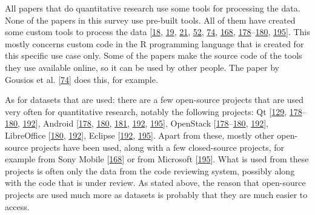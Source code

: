 \documentclass[]{book}
\begin{document}
All papers that do quantitative research use some tools for processing
the data. None of the papers in this survey use pre-built tools. All of
them have created some custom tools to process the data
{[}\protect\hyperlink{ref-baysal2016investigating}{18},
\protect\hyperlink{ref-baysal2013influence}{19},
\protect\hyperlink{ref-beller2014modern}{21},
\protect\hyperlink{ref-czerwonka2015code}{52},
\protect\hyperlink{ref-gousios2014exploratory}{74},
\protect\hyperlink{ref-shimagaki2016study}{168},
\protect\hyperlink{ref-thongtanunam2017review}{178}--\protect\hyperlink{ref-thongtanunam2015should}{180},
\protect\hyperlink{ref-zanjani2016automatically}{195}{]}. This mostly
concerns custom code in the R programming language that is created for
this specific use case only. Some of the papers make the source code of
the tools they use available online, so it can be used by other people.
The paper by Gousios et al.
{[}\protect\hyperlink{ref-gousios2014exploratory}{74}{]} does this, for
example.

As for datasets that are used: there are a few open-source projects that
are used very often for quantitative research, notably the following
projects: Qt {[}\protect\hyperlink{ref-mcintosh2014impact}{129},
\protect\hyperlink{ref-thongtanunam2017review}{178}--\protect\hyperlink{ref-thongtanunam2015should}{180},
\protect\hyperlink{ref-yang2016mining}{192}{]}, Android
{[}\protect\hyperlink{ref-thongtanunam2017review}{178},
\protect\hyperlink{ref-thongtanunam2015should}{180},
\protect\hyperlink{ref-thongtanunam2014reda}{181},
\protect\hyperlink{ref-yang2016mining}{192},
\protect\hyperlink{ref-zanjani2016automatically}{195}{]}, OpenStack
{[}\protect\hyperlink{ref-thongtanunam2017review}{178}--\protect\hyperlink{ref-thongtanunam2015should}{180},
\protect\hyperlink{ref-yang2016mining}{192}{]}, LibreOffice
{[}\protect\hyperlink{ref-thongtanunam2015should}{180},
\protect\hyperlink{ref-yang2016mining}{192}{]}, Eclipse
{[}\protect\hyperlink{ref-yang2016mining}{192},
\protect\hyperlink{ref-zanjani2016automatically}{195}{]}. Apart from
these, mostly other open-source projects have been used, along with a
few closed-source projects, for example from Sony Mobile
{[}\protect\hyperlink{ref-shimagaki2016study}{168}{]} or from Microsoft
{[}\protect\hyperlink{ref-zanjani2016automatically}{195}{]}. What is
used from these projects is often only the data from the code reviewing
system, possibly along with the code that is under review. As stated
above, the reason that open-source projects are used much more as
datasets is probably that they are much easier to access.
\end{document}
